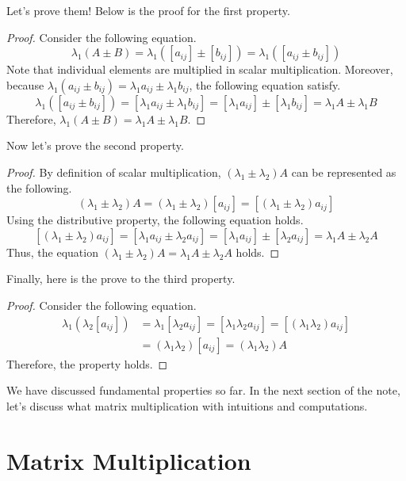 \documentclass[../main.tex]{subfiles}
\begin{document}
Let's prove them! Below is the proof for the first property.

\begin{proof}
Consider the following equation.
\[
\lambda_1 (A \pm B)
= \lambda_1 ([a_{ij}] \pm [b_{ij}])
= \lambda_1 ([a_{ij} \pm b_{ij}])
\]
Note that individual elements are multiplied in scalar multiplication.
Moreover, because $\lambda_1 (a_{ij} \pm b_{ij}) = \lambda_1 a_{ij}
\pm \lambda_1 b_{ij}$, the following equation satisfy.
\[
\lambda_1 ([a_{ij} \pm b_{ij}])
= [\lambda_1 a_{ij} \pm \lambda_1 b_{ij}]
= [\lambda_1 a_{ij}] \pm [\lambda_1 b_{ij}]
= \lambda_1 A \pm \lambda_1 B
\]
Therefore, $\lambda_1 (A \pm B) = \lambda_1 A \pm \lambda_1 B$.
\end{proof}

Now let's prove the second property.

\begin{proof}
By definition of scalar multiplication, $(\lambda_1 \pm \lambda_2)
A$ can be represented as the following.
\[
(\lambda_1 \pm \lambda_2) A
= (\lambda_1 \pm \lambda_2) [a_{ij}]
= [(\lambda_1 \pm \lambda_2) a_{ij}]
\]
Using the distributive property, the following equation holds.
\[
[(\lambda_1 \pm \lambda_2) a_{ij}]
= [\lambda_1 a_{ij} \pm \lambda_2 a_{ij}]
= [\lambda_1 a_{ij}] \pm [\lambda_2 a_{ij}]
= \lambda_1 A \pm \lambda_2 A
\]
Thus, the equation $(\lambda_1 \pm \lambda_2) A =
\lambda_1 A \pm \lambda_2 A$ holds.
\end{proof}

Finally, here is the prove to the third property.

\begin{proof}
Consider the following equation.
\begin{align*}
    \lambda_1 (\lambda_2 [a_{ij}])
    &= \lambda_1 [\lambda_2 a_{ij}]
    = [\lambda_1 \lambda_2 a_{ij}]
    = [(\lambda_1 \lambda_2) a_{ij}] \\
    &= (\lambda_1 \lambda_2) [a_{ij}]
    = (\lambda_1 \lambda_2) A
\end{align*}
Therefore, the property holds.
\end{proof}

We have discussed fundamental properties so far. In the next
section of the note, let's discuss what matrix multiplication
with intuitions and computations.

\section{Matrix Multiplication}
\end{document}
